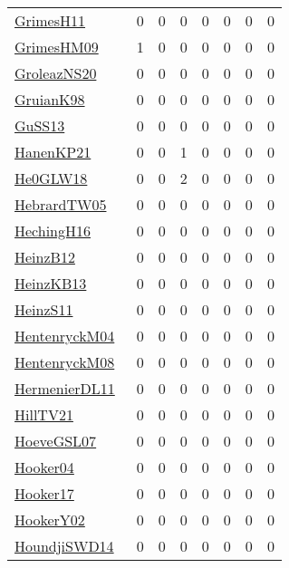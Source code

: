 {\begin{longtable}{l*{7}{r}}
\href{papers/GrimesH11.pdf}{GrimesH11}~\cite{GrimesH11} & 0 & 0 & 0 & 0 & 0 & 0 & 0\\
\href{papers/GrimesHM09.pdf}{GrimesHM09}~\cite{GrimesHM09} & 1 & 0 & 0 & 0 & 0 & 0 & 0\\
\href{papers/GroleazNS20.pdf}{GroleazNS20}~\cite{GroleazNS20} & 0 & 0 & 0 & 0 & 0 & 0 & 0\\
\href{papers/GruianK98.pdf}{GruianK98}~\cite{GruianK98} & 0 & 0 & 0 & 0 & 0 & 0 & 0\\
\href{papers/GuSS13.pdf}{GuSS13}~\cite{GuSS13} & 0 & 0 & 0 & 0 & 0 & 0 & 0\\
\href{papers/HanenKP21.pdf}{HanenKP21}~\cite{HanenKP21} & 0 & 0 & 1 & 0 & 0 & 0 & 0\\
\href{papers/He0GLW18.pdf}{He0GLW18}~\cite{He0GLW18} & 0 & 0 & 2 & 0 & 0 & 0 & 0\\
\href{papers/HebrardTW05.pdf}{HebrardTW05}~\cite{HebrardTW05} & 0 & 0 & 0 & 0 & 0 & 0 & 0\\
\href{papers/HechingH16.pdf}{HechingH16}~\cite{HechingH16} & 0 & 0 & 0 & 0 & 0 & 0 & 0\\
\href{papers/HeinzB12.pdf}{HeinzB12}~\cite{HeinzB12} & 0 & 0 & 0 & 0 & 0 & 0 & 0\\
\href{papers/HeinzKB13.pdf}{HeinzKB13}~\cite{HeinzKB13} & 0 & 0 & 0 & 0 & 0 & 0 & 0\\
\href{papers/HeinzS11.pdf}{HeinzS11}~\cite{HeinzS11} & 0 & 0 & 0 & 0 & 0 & 0 & 0\\
\href{papers/HentenryckM04.pdf}{HentenryckM04}~\cite{HentenryckM04} & 0 & 0 & 0 & 0 & 0 & 0 & 0\\
\href{papers/HentenryckM08.pdf}{HentenryckM08}~\cite{HentenryckM08} & 0 & 0 & 0 & 0 & 0 & 0 & 0\\
\href{papers/HermenierDL11.pdf}{HermenierDL11}~\cite{HermenierDL11} & 0 & 0 & 0 & 0 & 0 & 0 & 0\\
\href{papers/HillTV21.pdf}{HillTV21}~\cite{HillTV21} & 0 & 0 & 0 & 0 & 0 & 0 & 0\\
\href{papers/HoeveGSL07.pdf}{HoeveGSL07}~\cite{HoeveGSL07} & 0 & 0 & 0 & 0 & 0 & 0 & 0\\
\href{papers/Hooker04.pdf}{Hooker04}~\cite{Hooker04} & 0 & 0 & 0 & 0 & 0 & 0 & 0\\
\href{papers/Hooker17.pdf}{Hooker17}~\cite{Hooker17} & 0 & 0 & 0 & 0 & 0 & 0 & 0\\
\href{papers/HookerY02.pdf}{HookerY02}~\cite{HookerY02} & 0 & 0 & 0 & 0 & 0 & 0 & 0\\
\href{papers/HoundjiSWD14.pdf}{HoundjiSWD14}~\cite{HoundjiSWD14} & 0 & 0 & 0 & 0 & 0 & 0 & 0\\

\end{longtable}}
